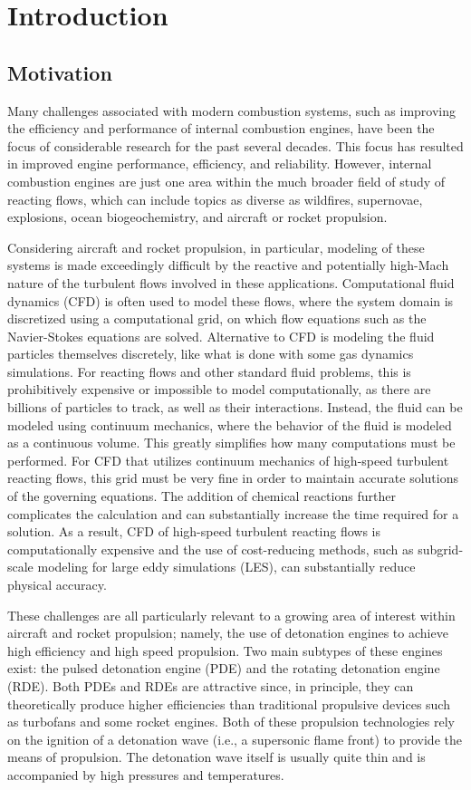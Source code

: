 \chapter{Introduction}
\label{introchap}


\section{Motivation}
Many challenges associated with modern combustion systems, such as improving the efficiency and performance of internal combustion engines, have been the focus of considerable research for the past several decades. This focus has resulted in improved engine performance, efficiency, and reliability. However, internal combustion engines are just one area within the much broader field of study of reacting flows, which can include topics as diverse as wildfires, supernovae, explosions, ocean biogeochemistry, and aircraft or rocket propulsion.

Considering aircraft and rocket propulsion, in particular, modeling of these systems is made exceedingly difficult by the reactive and potentially high-Mach nature of the turbulent flows involved in these applications. Computational fluid dynamics (CFD) is often used to model these flows, where the system domain is discretized using a computational grid, on which flow equations such as the Navier-Stokes equations are solved. Alternative to CFD is modeling the fluid particles themselves discretely, like what is done with some gas dynamics simulations. For reacting flows and other standard fluid problems, this is prohibitively expensive or impossible to model computationally, as there are billions of particles to track, as well as their interactions. Instead, the fluid can be modeled using continuum mechanics, where the behavior of the fluid is modeled as a continuous volume. This greatly simplifies how many computations must be performed. For CFD that utilizes continuum mechanics of high-speed turbulent reacting flows, this grid must be very fine in order to maintain accurate solutions of the governing equations. The addition of chemical reactions further complicates the calculation and can substantially increase the time required for a solution. As a result, CFD of high-speed turbulent reacting flows is computationally expensive and the use of cost-reducing methods, such as subgrid-scale modeling for large eddy simulations (LES), can substantially reduce physical accuracy.  

These challenges are all particularly relevant to a growing area of interest within aircraft and rocket propulsion; namely, the use of detonation engines to achieve high efficiency and high speed propulsion. Two main subtypes of these engines exist: the pulsed detonation engine (PDE) and the rotating detonation engine (RDE). Both PDEs and RDEs are attractive since, in principle, they can theoretically produce higher efficiencies than traditional propulsive devices such as turbofans and some rocket engines. Both of these propulsion technologies rely on the ignition of a detonation wave (i.e., a supersonic flame front) to provide the means of propulsion. The detonation wave itself is usually quite thin and is accompanied by high pressures and temperatures. 

